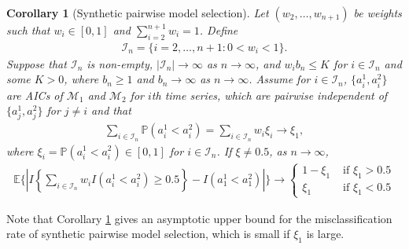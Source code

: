 \documentclass[11pt]{article}
\def\mc#1{\mathcal{#1}} %
\def\E{\mathbb{E}} %
\def\mc#1{\mathcal{#1}}
\def\P{\mathbb{P}}
\newtheorem{corollary}{Corollary}
\theoremstyle{definition}
\begin{document}
\begin{corollary}[Synthetic pairwise model selection]
\label{coro2}Let $(w_2, \ldots, w_{n+1})$ be weights such that $w_i \in [0,1]$ and $\sum_{i=2}^{n+1} w_i=1$. Define
\begin{align*}
  \mc{I}_n = \{i =  2,\ldots, n+1\colon 0< w_i < 1\}.
\end{align*}
Suppose that  $\mc{I}_n$  is non-empty, $|\mc{I}_n| \to \infty$ as $n \to \infty$, and $w_i b_n\leq K$ for $i\in \mc{I}_n$ and some $K>0$, where $b_n \geq 1$ and $b_n \to \infty$ as $n\to \infty$. Assume for $i \in \mc{I}_n$,  $\{a_i^1, a_i^2\}$ are AICs of $\mc{M}_1$ and  $\mc{M}_2$ for $i$th time series, which are pairwise independent of $\{a_j^1, a_j^2\}$ for $j \neq i$ and that
\begin{align*}
  \sum_{i\in \mc{I}_n}\P(a_i^1 < a_i^2) = \sum_{i\in \mc{I}_n} w_i \xi_i \to \xi_{1},
\end{align*}
where $\xi_i =  \P(a_i^1 < a_i^2)\in [0,1]$ for $i \in \mc{I}_n$. If $\xi  \neq 0.5$, as $n\to \infty$, 
\begin{align*}
  \E \bigg\{\left|I\left\{ \sum_{i\in \mc{I}_n} w_i I(a_i^1 < a_i^2) \geq 0.5\right\}
  - I( a_1^1 < a_1^2) \right|\bigg\}
  \to  \begin{cases}
    1- \xi_1 & \text{ if } \xi_1 > 0.5 \\
   \xi_1 & \text{ if } \xi_1 < 0.5 
  \end{cases}
\end{align*}
\end{corollary}

Note that Corollary \ref{coro2} gives an asymptotic upper bound for the misclassification rate of synthetic pairwise model selection, which is small if $\xi_1$ is large.


\newpage
\end{document}
